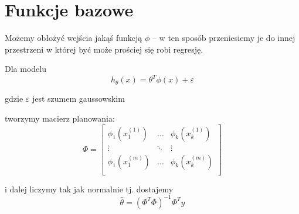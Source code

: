 \section{Funkcje bazowe}

Możemy obłożyć wejścia jakąś funkcją \( \phi \) -- w ten sposób przeniesiemy je do innej przestrzeni w której być może prościej się robi regresję.

Dla modelu
\[
	h_\theta(x) = \theta^T\phi(x) + \varepsilon
\]

gdzie \( \varepsilon \) jest szumem gaussowskim

tworzymy macierz planowania:
\[
	\Phi = \begin{bmatrix}
		\phi_1(x^{(1)}_1) & \hdots & \phi_k(x^{(1)}_k) \\
		\vdots            & \ddots & \vdots            \\
		\phi_1(x^{(m)}_1) & \hdots & \phi_k(x^{(m)}_k) \\
	\end{bmatrix}
\]

i dalej liczymy tak jak normalnie tj. dostajemy
\[
	\widehat \theta = (\Phi^T\Phi)^{-1}\Phi^T y
\]